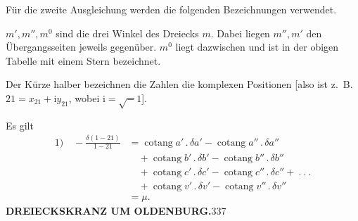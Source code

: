 \par Für die zweite Ausgleichung werden die folgenden Bezeichnungen verwendet.

\(m',m'',m^0\) sind die drei Winkel des Dreiecks \(m\). Dabei liegen \(m'',m'\) den Übergangsseiten jeweils gegenüber. \(m^0\) liegt dazwischen und ist in der obigen Tabelle mit einem Stern bezeichnet.

Der Kürze halber bezeichnen die Zahlen die komplexen Positionen [also ist z.~B. \(21=x_{21}+\mathrm{i}y_{21}\), wobei \(\mathrm{i}=\surd-1\)].

Es gilt
\[
\begin{aligned}
1)\quad-\frac{\delta(1-21)}{1-21}
&=\operatorname{cotang}a'\,.\,\delta a'-\operatorname{cotang}a''\,.\,\delta a''\\
&\quad+\operatorname{cotang}b'\,.\,\delta b'-\operatorname{cotang}b''\,.\,\delta b''\\
&\quad+\operatorname{cotang}c'\,.\,\delta c'-\operatorname{cotang}c''\,.\,\delta c''+\ .\ .\ .\\
&\quad+\operatorname{cotang}v'\,.\,\delta v'-\operatorname{cotang}v''\,.\,\delta v''\\
&=\mu.
\end{aligned}
\]
\clearpage
\noindent\textbf{DREIECKSKRANZ UM OLDENBURG.}\hfill337\par\medskip
\begingroup\small\setlength{\abovedisplayskip}{5pt}\setlength{\belowdisplayskip}{5pt}
